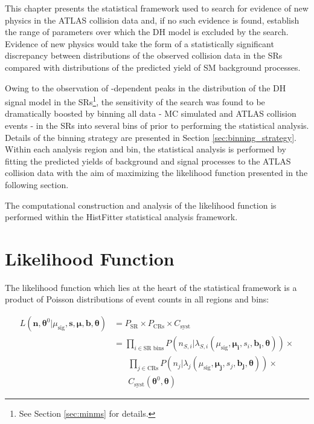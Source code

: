 \label{chapter:stat}

This chapter presents the statistical framework used to search for evidence of new physics in the ATLAS collision data and, if no such evidence is found, establish the range of parameters over which the DH model is excluded by the search. Evidence of new physics would take the form of a statistically significant discrepancy between distributions of the observed collision data in the SRs compared with distributions of the predicted yield of SM background processes.

Owing to the observation of \ms-dependent peaks in the \minms distribution of the DH signal model in the SRs\footnote{See Section \ref{sec:minms} for details.}, the sensitivity of the search was found to be dramatically boosted by binning all data - MC simulated and ATLAS collision events - in the SRs into several bins of \minms prior to performing the statistical analysis. Details of the binning strategy are presented in Section \ref{sec:binning_strategy}. Within each analysis region and bin, the statistical analysis is performed by fitting the predicted yields of background and signal processes to the ATLAS collision data with the aim of maximizing the likelihood function presented in the following section. 

The computational construction and analysis of the likelihood function is performed within the HistFitter \cite{Baak_2015} statistical analysis framework.

\section{Likelihood Function}
\label{sec:likelihood}

The likelihood function which lies at the heart of the statistical framework is a product of Poisson distributions of event counts in all regions and bins:

\begin{equation}
\label{eq:likelihood_func}
\begin{aligned}
L(\boldsymbol{n}, \boldsymbol{\theta}^0|\mu_\text{sig}, \boldsymbol{s}, \boldsymbol{\mu}, \boldsymbol{b}, \boldsymbol{\theta}) & = P_\text{SR} \times P_\text{CRs} \times C_\text{syst} \\
& = \prod_{i\in\text{SR bins}} P(n_{S,i}|\lambda_{S,i}(\mu_\text{sig}, \boldsymbol{\mu_i}, s_i, \boldsymbol{b_i}, \boldsymbol{\theta})) \times \\ 
&\phantom{xxx}\prod_{j \in \text{CRs}} P(n_j|\lambda_j(\mu_\text{sig}, \boldsymbol{\mu_j}, s_j, \boldsymbol{b_j}, \boldsymbol{\theta})) \times \\
&\phantom{xxx}C_\text{syst}(\boldsymbol{\theta}^0, \boldsymbol{\theta})
\end{aligned}
\end{equation}

